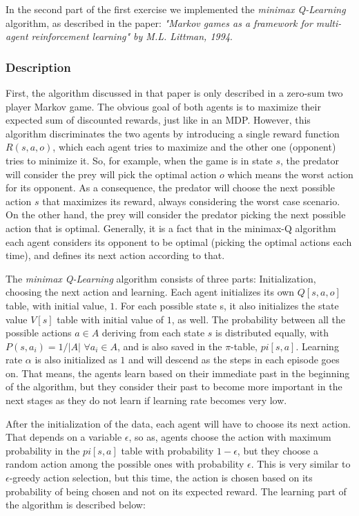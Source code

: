 \documentclass[a4paper,11pt]{article}
\begin{document}
In the second part of the first exercise we implemented the \textit{minimax Q-Learning} algorithm, as described in the paper: \textit{"Markov games as a framework for multi-agent reinforcement learning" by M.L. Littman, 1994}.

\subsubsection{Description}
First, the algorithm discussed in that paper is only described in a zero-sum two player Markov game. The obvious goal of both agents is to maximize their expected sum of discounted rewards, just like in an MDP. However, this algorithm discriminates the two agents by introducing a single reward function $R(s,a,o)$, which each agent tries to maximize and the other one (opponent) tries to minimize it. So, for example, when the game is in state $s$, the predator will consider the prey will pick the optimal action $o$ which means the worst action for its opponent. As a consequence, the predator will choose the next possible action $s$ that maximizes its reward, always considering the worst case scenario. On the other hand, the prey will consider the predator picking the next possible action that is optimal. Generally, it is a fact that in the minimax-Q algorithm each agent considers its opponent to be optimal (picking the optimal actions each time), and defines its next action according to that. 

The \textit{minimax Q-Learning} algorithm consists of three parts: 	Initialization, choosing the next action and learning. Each agent initializes its own $Q[s,a,o]$ table, with initial value, $1$. For each possible state s, it also initializes the state value $V[s]$ table with initial value of $1$, as well. The probability between all the possible actions $a \in A$ deriving from each state $s$ is distributed equally, with $P(s,a_{i}) = 1/|A|$ $\forall a_i \in A$, and is also saved in the $\pi$-table, $pi[s,a]$. Learning rate $\alpha$ is also initialized as $1$ and will descend as the steps in each episode goes on. That means, the agents learn based on their immediate past in the beginning of the algorithm, but they consider their past to become more important in the next stages as they do not learn if learning rate becomes very low.

After the initialization of the data, each agent will have to choose its next action. That depends on a variable $\epsilon$, so as, agents choose the action with maximum probability in the $pi[s,a]$ table with probability $1-\epsilon$, but they choose a random action among the possible ones with probability $\epsilon$. This is very similar to $\epsilon$-greedy action selection, but this time, the action is chosen based on its probability of being chosen and not on its expected reward. The learning part of the algorithm is described below:
\end{document}
